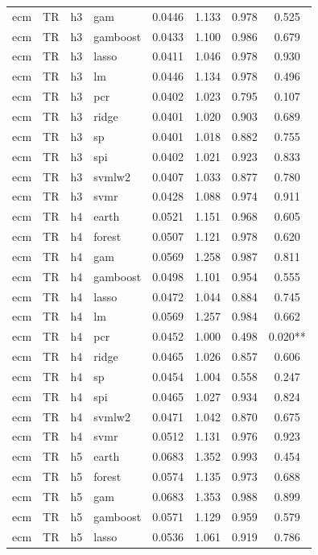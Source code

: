 \begin{ThreePartTable}
\begin{longtable}[t]{llclcccc}
ecm & TR & h3 & gam & 0.0446 & 1.133 & 0.978 & 0.525\\
ecm & TR & h3 & gamboost & 0.0433 & 1.100 & 0.986 & 0.679\\
ecm & TR & h3 & lasso & 0.0411 & 1.046 & 0.978 & 0.930\\
ecm & TR & h3 & lm & 0.0446 & 1.134 & 0.978 & 0.496\\
ecm & TR & h3 & pcr & 0.0402 & 1.023 & 0.795 & 0.107\\
ecm & TR & h3 & ridge & 0.0401 & 1.020 & 0.903 & 0.689\\
ecm & TR & h3 & sp & 0.0401 & 1.018 & 0.882 & 0.755\\
ecm & TR & h3 & spi & 0.0402 & 1.021 & 0.923 & 0.833\\
ecm & TR & h3 & svmlw2 & 0.0407 & 1.033 & 0.877 & 0.780\\
ecm & TR & h3 & svmr & 0.0428 & 1.088 & 0.974 & 0.911\\
\addlinespace
ecm & TR & h4 & earth & 0.0521 & 1.151 & 0.968 & 0.605\\
ecm & TR & h4 & forest & 0.0507 & 1.121 & 0.978 & 0.620\\
ecm & TR & h4 & gam & 0.0569 & 1.258 & 0.987 & 0.811\\
ecm & TR & h4 & gamboost & 0.0498 & 1.101 & 0.954 & 0.555\\
ecm & TR & h4 & lasso & 0.0472 & 1.044 & 0.884 & 0.745\\
ecm & TR & h4 & lm & 0.0569 & 1.257 & 0.984 & 0.662\\
ecm & TR & h4 & pcr & 0.0452 & 1.000 & 0.498 & 0.020**\\
ecm & TR & h4 & ridge & 0.0465 & 1.026 & 0.857 & 0.606\\
ecm & TR & h4 & sp & 0.0454 & 1.004 & 0.558 & 0.247\\
ecm & TR & h4 & spi & 0.0465 & 1.027 & 0.934 & 0.824\\
ecm & TR & h4 & svmlw2 & 0.0471 & 1.042 & 0.870 & 0.675\\
ecm & TR & h4 & svmr & 0.0512 & 1.131 & 0.976 & 0.923\\
\addlinespace
ecm & TR & h5 & earth & 0.0683 & 1.352 & 0.993 & 0.454\\
ecm & TR & h5 & forest & 0.0574 & 1.135 & 0.973 & 0.688\\
ecm & TR & h5 & gam & 0.0683 & 1.353 & 0.988 & 0.899\\
ecm & TR & h5 & gamboost & 0.0571 & 1.129 & 0.959 & 0.579\\
ecm & TR & h5 & lasso & 0.0536 & 1.061 & 0.919 & 0.786\\

\end{longtable}
\end{ThreePartTable}
